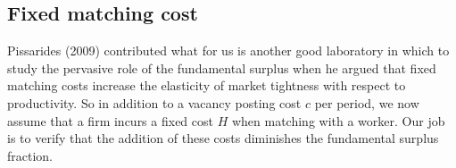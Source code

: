 

\subsection{Fixed matching cost}
%
Pissarides (2009) contributed what for us is  another good laboratory in which to study the pervasive role
of the fundamental surplus  when he argued that fixed
matching costs increase the elasticity of market
tightness with respect to productivity. So in addition to a vacancy posting cost $c$ per period,
we now assume that a firm incurs a fixed cost $H$ when matching
with a worker. Our job is  to verify that the addition of these
 costs diminishes the fundamental surplus fraction.


